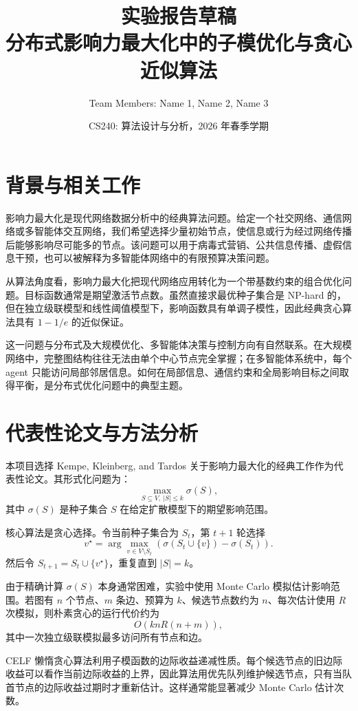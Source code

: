\documentclass[UTF8, 11pt]{ctexart}
\title{\textbf{实验报告草稿}\\
分布式影响力最大化中的子模优化与贪心近似算法}
\author{Team Members: Name 1, Name 2, Name 3}
\date{CS240: 算法设计与分析，2026 年春季学期}
\begin{document}
\maketitle

\section{背景与相关工作}

影响力最大化是现代网络数据分析中的经典算法问题。给定一个社交网络、通信网络或多智能体交互网络，我们希望选择少量初始节点，使信息或行为经过网络传播后能够影响尽可能多的节点。该问题可以用于病毒式营销、公共信息传播、虚假信息干预，也可以被解释为多智能体网络中的有限预算决策问题。

从算法角度看，影响力最大化把现代网络应用转化为一个带基数约束的组合优化问题。目标函数通常是期望激活节点数。虽然直接求最优种子集合是 NP-hard 的，但在独立级联模型和线性阈值模型下，影响函数具有单调子模性，因此经典贪心算法具有 $1-1/e$ 的近似保证。

这一问题与分布式及大规模优化、多智能体决策与控制方向有自然联系。在大规模网络中，完整图结构往往无法由单个中心节点完全掌握；在多智能体系统中，每个 agent 只能访问局部邻居信息。如何在局部信息、通信约束和全局影响目标之间取得平衡，是分布式优化问题中的典型主题。

\section{代表性论文与方法分析}

本项目选择 Kempe, Kleinberg, and Tardos 关于影响力最大化的经典工作作为代表性论文。其形式化问题为：
\[
    \max_{S\subseteq V,\ |S|\leq k} \sigma(S),
\]
其中 $\sigma(S)$ 是种子集合 $S$ 在给定扩散模型下的期望影响范围。

核心算法是贪心选择。令当前种子集合为 $S_t$，第 $t+1$ 轮选择
\[
    v^\star
    =
    \arg\max_{v\in V\setminus S_t}
    \left(\sigma(S_t\cup\{v\})-\sigma(S_t)\right).
\]
然后令 $S_{t+1}=S_t\cup\{v^\star\}$，重复直到 $|S|=k$。

由于精确计算 $\sigma(S)$ 本身通常困难，实验中使用 Monte Carlo 模拟估计影响范围。若图有 $n$ 个节点、$m$ 条边、预算为 $k$、候选节点数约为 $n$、每次估计使用 $R$ 次模拟，则朴素贪心的运行代价约为
\[
    O(k n R (n+m)),
\]
其中一次独立级联模拟最多访问所有节点和边。

CELF 懒惰贪心算法利用子模函数的边际收益递减性质。每个候选节点的旧边际收益可以看作当前边际收益的上界，因此算法用优先队列维护候选节点，只有当队首节点的边际收益过期时才重新估计。这样通常能显著减少 Monte Carlo 估计次数。
\end{document}
